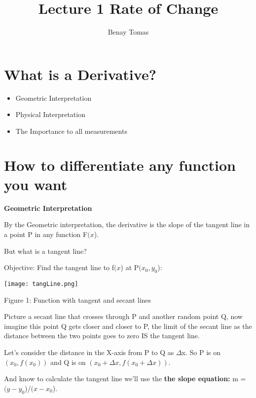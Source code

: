 \documentclass{article}
\title{Lecture 1 Rate of Change}
\author{Benay Tomas}
\begin{document}
\maketitle

\indent
\section{What is a Derivative?}

{\Large
\begin{itemize}
    \item Geometric Interpretation
    \item Physical Interpretation
    \item The Importance to all measurements
\end{itemize}
}

\section{How to differentiate any function you want}

\vspace{0.25cm}
\Large
\textbf{Geometric Interpretation}

\vspace{0.5cm}
By the Geometric interpretation, the derivative is
the slope of the tangent line in a point P in any function F$(x$).

But what is a tangent line?

Objective: Find the tangent line to f$(x$) at P$(x_0,y_0$):

\vspace{1cm}
\begin{center}
\texttt{[image: tangLine.png]}

Figure 1: Function with tangent and secant lines
\end{center}

\vspace{1cm}

Picture a secant line that crosses through P and another
random point Q, now imagine this point Q gets closer and closer
to P, the limit of the secant line as the distance
between the two points goes to zero IS the tangent line.

\newpage

Let's consider the distance in the X-axis from P to Q as $\Delta$x.
So P is on $(x_0, f(x_0))$ and Q is on $(x_0+\Delta x, f(x_0+\Delta x))$.

And know to calculate the tangent line we'll use the \textbf{the slope equation:}
m = $(y-y_0$)/$(x-x_0$).
\end{document}
